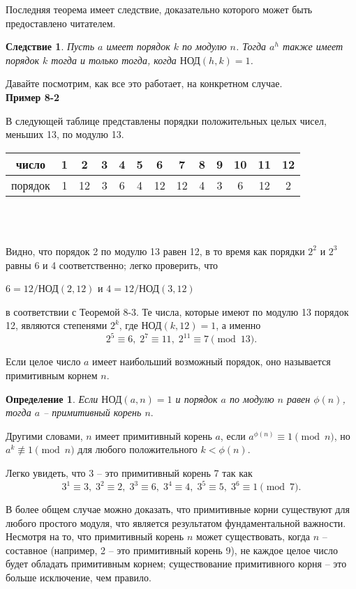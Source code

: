 \documentclass[11pt]{article}
\newtheorem{definition}{Определение}
\newtheorem{corollary}{Следствие}
\begin{document}
Последняя теорема имеет следствие, доказательно которого может быть предоставлено читателем.

\begin{corollary}
	\it Пусть $a$ имеет порядок $k$ по модулю $n$. Тогда $a^h$ также имеет порядок $k$ тогда и только тогда, когда $\text{НОД}(h,k)=1$.
\end{corollary}

Давайте посмотрим, как все это работает, на конкретном случае.\\

\textbf{Пример 8-2}

В следующей таблице представлены порядки положительных целых чисел, меньших 13, по модулю 13.\\

\begin{tabular}{c|c c c c c c c c c c c c}
    число &1 &2 &3 &4 &5 &6 &7 &8 &9 &10 &11 &12\\
    \hline
    порядок &1 &12 &3 &6 &4 &12 &12 &4 &3 &6 &12 &2
\end{tabular}\\\\
\newpage
\thispagestyle{fancyOdd}

Видно, что порядок 2 по модулю 13 равен 12, в то время как порядки $2^2$ и $2^3$ равны 6 и 4 соответственно; легко проверить, что
\begin{center}
    $6=12/\text{НОД}(2,12)$ и $4=12/\text{НОД}(3,12)$
\end{center}
в соответствии с Теоремой 8-3. Те числа, которые имеют по модулю 13 порядок 12, являются степенями $2^k$, где $\text{НОД}(k,12)=1$, а именно $$2^5\equiv6,\;2^7\equiv11,\;2^{11}\equiv7\pmod{13}.$$

Если целое число $a$ имеет наибольший возможный порядок, оно называется примитивным корнем $n$.

\begin{definition}
	Если $\text{НОД}(a,n)=1$ и порядок $a$ по модулю $n$ равен $\phi(n)$, тогда $a$ -- \emph{примитивный корень} $n.$
\end{definition}

Другими словами, $n$ имеет примитивный корень $a$, если $a^{\phi(n)}\equiv1\pmod{n}$, но $a^k\not\equiv1\pmod{n}$ для любого положительного $k<\phi(n)$.

Легко увидеть, что 3 -- это примитивный корень 7 так как $$3^1\equiv3,\; 3^2\equiv2,\; 3^3\equiv6,\; 3^4\equiv4,\; 3^5\equiv5,\; 3^6\equiv1\pmod{7}.$$

В более общем случае можно доказать, что примитивные корни существуют для любого простого модуля, что является результатом фундаментальной важности. Несмотря на то, что примитивный корень $n$ может существовать, когда $n$ -- составное (например, 2 -- это примитивный корень 9), не каждое целое число будет обладать примитивным корнем; существование примитивного корня -- это больше исключение, чем правило.\\
\end{document}
